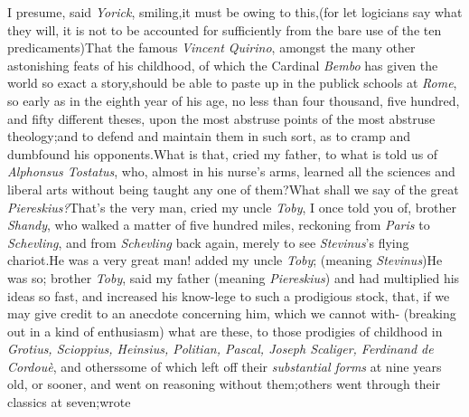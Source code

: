 \documentclass{article}
\begin{document}
I presume, said \textit{Yorick}, smiling,\tsk it must be owing to
this,\tsk (for let logicians say what they will, it is not to be accounted
for sufficiently from the bare use of the ten predicaments)\tsh That
the famous \textit{Vincent Quirino}, amongst the many other astonishing feats of
his childhood, of which the Cardinal \textit{Bembo} has given the world so exact
a story,\tsk should be able to paste up in the publick schools
at \textit{Rome}, so early as in the eighth year of his age, no less than four
thousand, five hundred, and fifty different theses, upon the most abstruse points of
the most abstruse theology;\tsk and to defend and maintain them in such sort, as to
cramp and dumbfound his opponents.\tsh\break What is that, cried my father, to what
is told us of \textit{Alphonsus Tostatus}, who, almost in his nurse’s arms, learned
all the sciences and liberal arts without being taught any one of them?\tsh What
shall we say of the great \textit{Piereskius?}\tsk\break That’s the very man, cried
my uncle \textit{Toby}, I once told you of, brother \textit{Shandy}, who walked a
matter of five hundred miles, reckoning from \textit{Paris} to \textit{Schevling},
and from \textit{Schevling} back again, merely to see \textit{Stevinus}’s flying
chariot.\tsh He was a very great man! added my uncle \textit{Toby}; (meaning
\textit{Stevinus})\tsk He was so; brother \textit{Toby}, said my father (meaning
\textit{Piereskius})\tsk\enlargethispage\baselineskip
and had multiplied his ideas so fast, and increased his
know-\break lege to such a prodigious stock, that, if we may give credit to an anecdote
concerning him, which we cannot with-\break{}
(breaking out in a kind of enthusiasm)\break
\tsk what are
these, to those prodigies of childhood in \textit{Grotius, Scioppius, Heinsius,
Politian, Pascal, Joseph Scaliger, Ferdinand de Cordouè}, and others\tsk some of
which left off their \textit{substantial forms} at
nine years old, or sooner, and went on reasoning without them;\tsk others went
through their classics at seven;\tsk wrote \break
\end{document}
